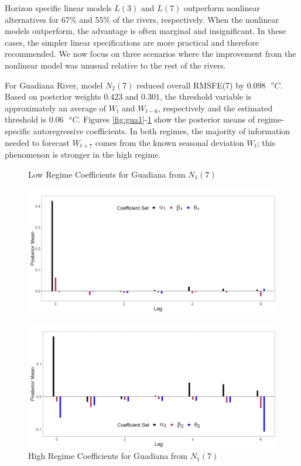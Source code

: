 Horizon specific linear models $L(3)$ and $L(7)$ outperform nonlinear alternatives for 67\% and 55\% of the rivers, respectively. 
When the nonlinear models outperform, the advantage is often marginal and insignificant. In these cases, the simpler linear specifications are more practical and therefore recommended. We now focus on three scenarios where the improvement from the nonlinear model was unusual relative to the rest of the rivers.

For Guadiana River, model $N_2(7)$ reduced overall RMSFE(7) by $0.098 \textrm{ }^o C$. Based on posterior weights $0.423$ and $0.301$, the threshold variable is approximately an average of $W_{t}$ and $W_{t-6}$, respectively and the estimated threshold is $0.06 \textrm{ }^o C$. Figures \ref{fig:gua1}-\ref{fig:gua2} show the posterior means of regime-specific autoregressive coefficients. In both regimes, the majority of information needed to forecast $W_{t+7}$ comes from the known seasonal deviation $W_t$; this phenomenon is stronger in the high regime.

\begin{figure}[!h]
\center
\begin{minipage}[h]{0.8\textwidth}
\caption{Low Regime Coefficients for Guadiana from $N_1(7)$}
\label{fig:gua1}
\includegraphics[scale=0.29]{GuadianaL}
\end{minipage} \hspace{\textwidth}
\begin{minipage}[h]{0.8\textwidth}
\caption{High Regime Coefficients for Guadiana from $N_1(7)$}
\label{fig:gua2}
\includegraphics[scale=0.29]{GuadianaH}
\end{minipage}
\end{figure}


